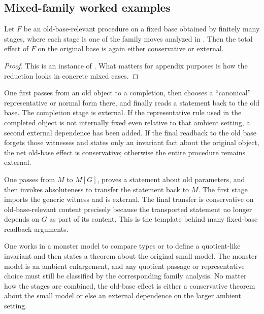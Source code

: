 \subsection{Mixed-family worked examples}

\begin{proposition}\label{prop:app-mixed}
Let $F$ be an old-base-relevant procedure on a fixed base obtained by finitely many stages, where each stage is one of the family moves analyzed in . Then the total effect of $F$ on the original base is again either conservative or external.
\end{proposition}

\begin{proof}
This is an instance of . What matters for appendix purposes is how the reduction looks in concrete mixed cases.
\end{proof}

\begin{example}
One first passes from an old object to a completion, then chooses a ``canonical'' representative or normal form there, and finally reads a statement back to the old base. The completion stage is external. If the representative rule used in the completed object is not internally fixed even relative to that ambient setting, a second external dependence has been added. If the final readback to the old base forgets those witnesses and states only an invariant fact about the original object, the net old-base effect is conservative; otherwise the entire procedure remains external.
\end{example}

\begin{example}
One passes from $M$ to $M[G]$, proves a statement about old parameters, and then invokes absoluteness to transfer the statement back to $M$. The first stage imports the generic witness and is external. The final transfer is conservative on old-base-relevant content precisely because the transported statement no longer depends on $G$ as part of its content. This is the template behind many fixed-base readback arguments.
\end{example}

\begin{example}
One works in a monster model to compare types or to define a quotient-like invariant and then states a theorem about the original small model. The monster model is an ambient enlargement, and any quotient passage or representative choice must still be classified by the corresponding family analysis. No matter how the stages are combined, the old-base effect is either a conservative theorem about the small model or else an external dependence on the larger ambient setting.
\end{example}
